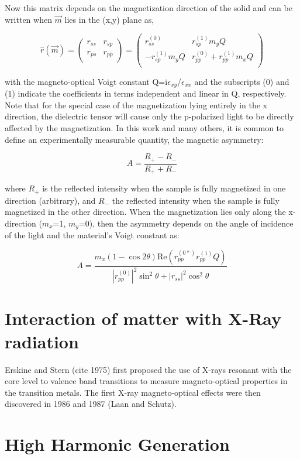 Now this matrix depends on the magnetization direction of the solid and can be written when $\vec{m}$ lies in the (x,y) plane as,

\begin{equation}
\hat{r}(\vec{m})= \left({\begin{array}{cc}
	r_{ss} & r_{sp} \\
	r_{ps} & r_{pp} \\ 
	\end{array} } \right) 
= \left({\begin{array}{cc}
	r_{ss}^{(0)} & r_{sp}^{(1)}m_y Q \\
	-r_{sp}^{(1)} m_y Q & r_{pp}^{(0)}+r_{pp}^{(1)}m_x Q \\ 
	\end{array} } \right)
\end{equation}

with the magneto-optical Voigt constant Q=i$\epsilon_{xy}$/$\epsilon_{xx}$ and the subscripts (0) and (1) indicate the coefficients in terms independent and linear in Q, respectively. Note that for the special case of the magnetization lying entirely in the x direction, the dielectric tensor will cause only the p-polarized light to be directly affected by the magnetization. In this work and many others, it is common to define an experimentally measurable quantity, the magnetic asymmetry:

\begin{equation}
A=\frac{R_+ - R_-}{R_+ + R_-}
\end{equation}

where $R_+$ is the reflected intensity when the sample is fully magnetized in one direction (arbitrary), and $R_-$ the reflected intensity when the sample is fully magnetized in the other direction. When the magnetization lies only along the x-direction ($m_x$=1, $m_y$=0), then the asymmetry depends on the angle of incidence of the light and the material's Voigt constant as:

\begin{equation}
A = \frac{m_x(1-\cos{2\theta})\text{Re}(r_{pp}^{(0*)}r_{pp}^{(1)}Q)}{|r_{pp}^{(0)}|^2\sin^2{\theta}+|r_{ss}|^2\cos^2{\theta}}
\end{equation}


\section{Interaction of matter with X-Ray radiation}

Erskine and Stern (cite 1975) first proposed the use of X-rays resonant with the core level to valence band transitions to measure magneto-optical properties in the transition metals. The first X-ray magneto-optical effects were then discovered in 1986 and 1987 (Laan and Schutz).

\section{High Harmonic Generation}

